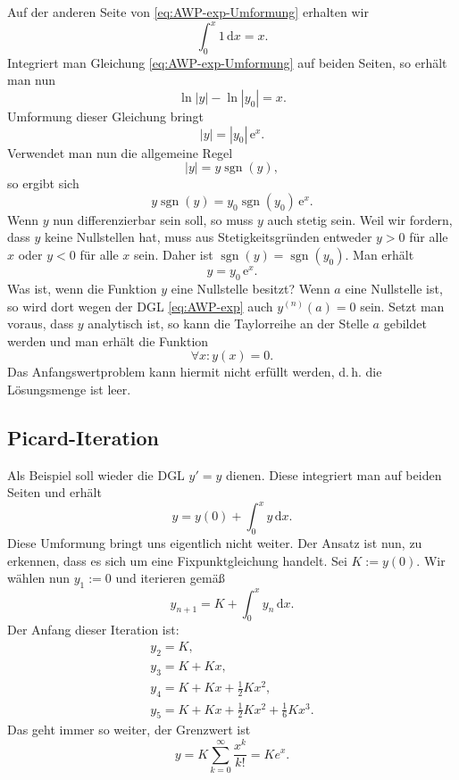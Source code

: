 \documentclass[a4paper,10pt,fleqn,twocolumn,twoside,openany]{article}
\numberwithin{equation}{section}
\newcommand{\ee}{\mathrm e}
\DeclareMathOperator*{\sgn}{sgn}
\theoremstyle{definition}
\begin{document}
Auf der anderen Seite von \eqref{eq:AWP-exp-Umformung} erhalten wir
\begin{equation}
\int_0^x 1\,\mathrm dx = x.
\end{equation}
Integriert man Gleichung \eqref{eq:AWP-exp-Umformung} auf beiden
Seiten, so erhält man nun
\begin{equation}
\ln|y|-\ln|y_0| = x.
\end{equation}
Umformung dieser Gleichung bringt
\begin{equation}
|y| = |y_0|\,\ee^x.
\end{equation}
Verwendet man nun die allgemeine Regel
\begin{equation}
|y|=y\sgn(y),
\end{equation}
so ergibt sich
\begin{equation}
y\sgn(y) = y_0\sgn(y_0)\,\ee^x.
\end{equation}
Wenn $y$ nun differenzierbar sein soll, so muss $y$ auch stetig sein.
Weil wir fordern, dass $y$ keine Nullstellen hat, muss aus
Stetigkeitsgründen entweder $y>0$ für alle $x$ oder $y<0$ für alle
$x$ sein. Daher ist $\sgn(y)=\sgn(y_0)$. Man erhält
\begin{equation}
y = y_0\,\ee^x.
\end{equation}
Was ist, wenn die Funktion $y$ eine Nullstelle besitzt? Wenn $a$
eine Nullstelle ist, so wird dort wegen der DGL \eqref{eq:AWP-exp}
auch $y^{(n)}(a)=0$ sein. Setzt man voraus, dass $y$ analytisch ist,
so kann die Taylorreihe an der Stelle $a$ gebildet werden und man
erhält die Funktion
\begin{equation}
\forall x\colon y(x)=0.
\end{equation}
Das Anfangswertproblem kann hiermit nicht erfüllt werden, d.\,h.
die Lösungsmenge ist leer.

\subsection{Picard-Iteration}

Als Beispiel soll wieder die DGL $y'=y$ dienen.
Diese integriert man auf beiden Seiten und erhält
\begin{equation}
y=y(0)+\int_0^x y\,\mathrm dx.
\end{equation}
Diese Umformung bringt uns eigentlich nicht weiter.
Der Ansatz ist nun, zu erkennen, dass es sich um eine
Fixpunktgleichung handelt. Sei $K:=y(0)$.
Wir wählen nun $y_1:=0$ und iterieren gemäß
\begin{equation}
y_{n+1} = K+\int_0^x y_n\,\mathrm dx.
\end{equation}
Der Anfang dieser Iteration ist:
\begin{gather}
y_2 = K,\\
y_3 = K+Kx,\\
y_4 = K+Kx+\frac{1}{2}Kx^2,\\
y_5 = K+Kx+\frac{1}{2}Kx^2+\frac{1}{6}Kx^3.
\end{gather}
Das geht immer so weiter, der Grenzwert ist
\begin{equation}
y = K\sum_{k=0}^{\infty} \frac{x^k}{k!} = Ke^x.
\end{equation}
\end{document}
